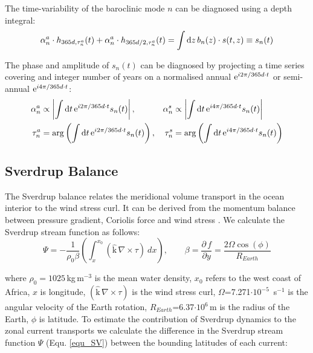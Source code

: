 \documentclass[os, manuscript]{copernicus}
\begin{document}
	The time-variability of the baroclinic mode $n$ can be diagnosed using a depth integral: 
	\begin{equation}
		\alpha^a_n \cdot h_{365d,\tau^a_n}(t) + \alpha^a_n \cdot h_{365d/2,\tau^a_n}(t) = \int {\rm d}z\, b_n(z) \cdot s(t,z) \equiv s_n(t)
	\end{equation}
	
	The phase and amplitude of $s_n(t)$ can be diagnosed by projecting a time series covering and integer number of years on a normalised annual ${\rm e}^{i2\pi/365d \cdot t}$ or semi-annual ${\rm e}^{i4\pi/365d \cdot t}$: 
	\begin{align}
		\alpha^a_n &\propto \left|\int {\rm d}t\, {\rm e}^{i2\pi/365d \cdot t} s_n(t)\right|,
		&\alpha^s_n &\propto \left|\int {\rm d}t\, {\rm e}^{i4\pi/365d \cdot t} s_n(t)\right| \\
		\tau^a_n &= {\rm arg}\left(\int {\rm d}t\, {\rm e}^{i2\pi/365d \cdot t} s_n(t)\right),
		&\tau^s_n &= {\rm arg}\left(\int {\rm d}t\, {\rm e}^{i4\pi/365d \cdot t} s_n(t)\right) 
	\end{align}
	
	\subsection{Sverdrup Balance}
	The Sverdrup balance relates the meridional volume transport in the ocean interior to the wind stress curl. It can be derived from the momentum balance between pressure gradient, Coriolis force and wind stress \citep{Sverdrup1947}. We calculate the Sverdrup stream function as follows: 
	\begin{equation}
		\Psi = - \frac{1}{\rho_0\beta}\left(\int_{x}^{x_0} \left(\hat{\text{k}}\, \nabla \times \tau\right) \ dx
		\right), \qquad
		\beta = \frac{\partial\, f}{\partial y} = \frac{2\Omega \cos(\phi)}{R_{Earth}}
		\label{equ_SV}
	\end{equation}
	
	where $\rho_0=1025\,$kg$\,$m$^{-3}$ is the mean water density, $x_0$ refers to the west coast of Africa, $x$ is longitude, $(\hat{\text{k}}\, \nabla \times \tau)$ is the wind stress curl, $\Omega$=7.271$\cdot 10^{-5}\,$ s$^{-1}$ is the angular velocity of the Earth rotation, $R_{Earth}$=6.37$\cdot 10^6\,$m is the radius of the Earth, $\phi$ is latitude. To estimate the contribution of Sverdrup dynamics to the zonal current transports we calculate the difference in the Sverdrup stream function $\Psi$ (Equ. \ref{equ_SV}) between the bounding latitudes of each current:
	
\end{document}
